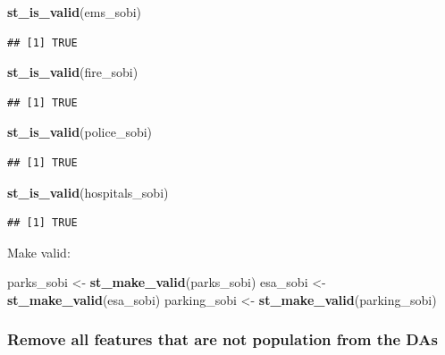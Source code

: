\documentclass[
]{article}
\newenvironment{Shaded}{\begin{snugshade}}{\end{snugshade}}
\newcommand{\KeywordTok}[1]{\textcolor[rgb]{0.13,0.29,0.53}{\textbf{#1}}}
\newcommand{\NormalTok}[1]{#1}
\newcommand{\StringTok}[1]{\textcolor[rgb]{0.31,0.60,0.02}{#1}}
\begin{document}
\begin{Shaded}
\begin{Highlighting}[]
\KeywordTok{st_is_valid}\NormalTok{(ems_sobi)}
\end{Highlighting}
\end{Shaded}

\begin{verbatim}
## [1] TRUE
\end{verbatim}

\begin{Shaded}
\begin{Highlighting}[]
\KeywordTok{st_is_valid}\NormalTok{(fire_sobi)}
\end{Highlighting}
\end{Shaded}

\begin{verbatim}
## [1] TRUE
\end{verbatim}

\begin{Shaded}
\begin{Highlighting}[]
\KeywordTok{st_is_valid}\NormalTok{(police_sobi)}
\end{Highlighting}
\end{Shaded}

\begin{verbatim}
## [1] TRUE
\end{verbatim}

\begin{Shaded}
\begin{Highlighting}[]
\KeywordTok{st_is_valid}\NormalTok{(hospitals_sobi)}
\end{Highlighting}
\end{Shaded}

\begin{verbatim}
## [1] TRUE
\end{verbatim}

Make valid:

\begin{Shaded}
\begin{Highlighting}[]
\NormalTok{parks_sobi <-}\StringTok{ }\KeywordTok{st_make_valid}\NormalTok{(parks_sobi)}
\NormalTok{esa_sobi <-}\StringTok{ }\KeywordTok{st_make_valid}\NormalTok{(esa_sobi)}
\NormalTok{parking_sobi <-}\StringTok{ }\KeywordTok{st_make_valid}\NormalTok{(parking_sobi)}
\end{Highlighting}
\end{Shaded}

\hypertarget{remove-all-features-that-are-not-population-from-the-das}{%
\subsubsection{Remove all features that are not population from the
DAs}\label{remove-all-features-that-are-not-population-from-the-das}}
\end{document}
